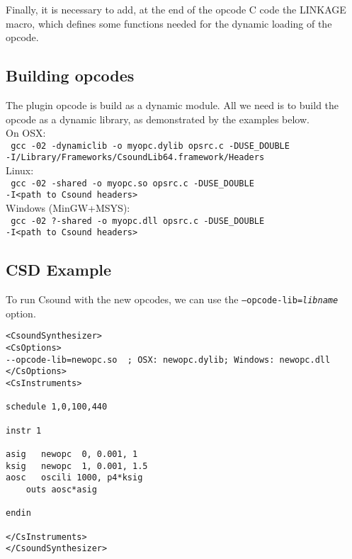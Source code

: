 \documentclass[11pt]{article}
\begin{document}
Finally, it is necessary to add, at the end of the opcode C code the LINKAGE macro, which defines some functions needed for the dynamic loading of the opcode. 

\subsection{Building opcodes} 

The plugin opcode is build as a dynamic module. All we need is to build the opcode as a dynamic library, as demonstrated by the examples below. \\

On OSX:\\

{\tt
gcc -02 -dynamiclib -o myopc.dylib opsrc.c -DUSE\_DOUBLE \\
    -I/Library/Frameworks/CsoundLib64.framework/Headers}\\

Linux:\\

{\tt
gcc -02 -shared -o myopc.so opsrc.c -DUSE\_DOUBLE \\
    -I<path to Csound headers>
}\\

Windows (MinGW+MSYS):\\

{\tt
gcc -02 ?-shared -o myopc.dll opsrc.c -DUSE\_DOUBLE \\
    -I<path to Csound headers>
}\\

\subsection{CSD Example}

To run Csound with the new opcodes, we can use the {\tt --opcode-lib=\emph{libname}} option.

\begin{lstlisting}
<CsoundSynthesizer>
<CsOptions>
--opcode-lib=newopc.so  ; OSX: newopc.dylib; Windows: newopc.dll
</CsOptions>
<CsInstruments>

schedule 1,0,100,440

instr 1

asig   newopc  0, 0.001, 1
ksig   newopc  1, 0.001, 1.5
aosc   oscili 1000, p4*ksig
    outs aosc*asig

endin

</CsInstruments>
</CsoundSynthesizer>
\end{lstlisting}
\end{document}
